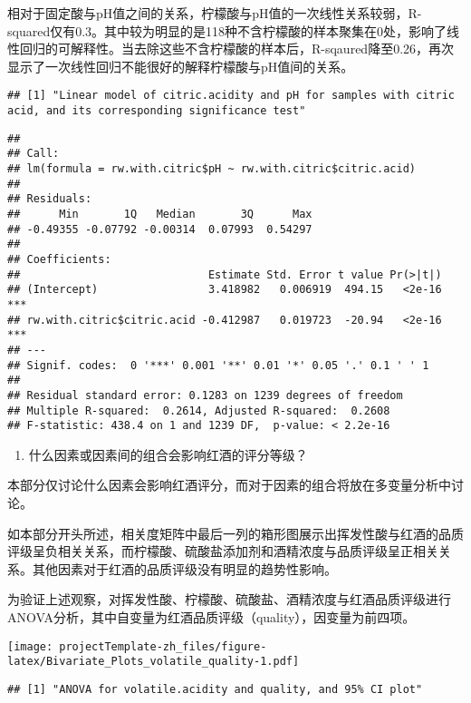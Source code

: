 \documentclass[]{article}
\providecommand{\tightlist}{%
  \setlength{\itemsep}{0pt}\setlength{\parskip}{0pt}}
\begin{document}
相对于固定酸与pH值之间的关系，柠檬酸与pH值的一次线性关系较弱，R-squared仅有0.3。其中较为明显的是118种不含柠檬酸的样本聚集在0处，影响了线性回归的可解释性。当去除这些不含柠檬酸的样本后，R-sqaured降至0.26，再次显示了一次线性回归不能很好的解释柠檬酸与pH值间的关系。

\begin{verbatim}
## [1] "Linear model of citric.acidity and pH for samples with citric acid, and its corresponding significance test"
\end{verbatim}

\begin{verbatim}
## 
## Call:
## lm(formula = rw.with.citric$pH ~ rw.with.citric$citric.acid)
## 
## Residuals:
##      Min       1Q   Median       3Q      Max 
## -0.49355 -0.07792 -0.00314  0.07993  0.54297 
## 
## Coefficients:
##                             Estimate Std. Error t value Pr(>|t|)    
## (Intercept)                 3.418982   0.006919  494.15   <2e-16 ***
## rw.with.citric$citric.acid -0.412987   0.019723  -20.94   <2e-16 ***
## ---
## Signif. codes:  0 '***' 0.001 '**' 0.01 '*' 0.05 '.' 0.1 ' ' 1
## 
## Residual standard error: 0.1283 on 1239 degrees of freedom
## Multiple R-squared:  0.2614, Adjusted R-squared:  0.2608 
## F-statistic: 438.4 on 1 and 1239 DF,  p-value: < 2.2e-16
\end{verbatim}

\begin{enumerate}
\def\labelenumi{\arabic{enumi}.}
\setcounter{enumi}{3}
\tightlist
\item
  什么因素或因素间的组合会影响红酒的评分等级？
\end{enumerate}

本部分仅讨论什么因素会影响红酒评分，而对于因素的组合将放在多变量分析中讨论。

如本部分开头所述，相关度矩阵中最后一列的箱形图展示出挥发性酸与红酒的品质评级呈负相关关系，而柠檬酸、硫酸盐添加剂和酒精浓度与品质评级呈正相关关系。其他因素对于红酒的品质评级没有明显的趋势性影响。

为验证上述观察，对挥发性酸、柠檬酸、硫酸盐、酒精浓度与红酒品质评级进行ANOVA分析，其中自变量为红酒品质评级（quality），因变量为前四项。

\texttt{[image: projectTemplate-zh\_files/figure-latex/Bivariate\_Plots\_volatile\_quality-1.pdf]}

\begin{verbatim}
## [1] "ANOVA for volatile.acidity and quality, and 95% CI plot"
\end{verbatim}
\end{document}
